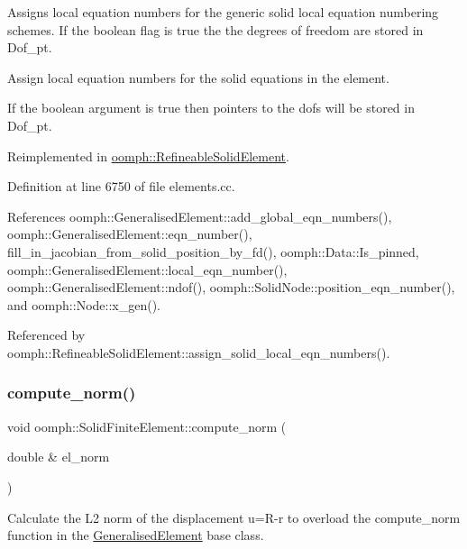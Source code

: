 Assigns local equation numbers for the generic solid local equation numbering schemes. If the boolean flag is true the the degrees of freedom are stored in Dof\+\_\+pt. 

Assign local equation numbers for the solid equations in the element.

If the boolean argument is true then pointers to the dofs will be stored in Dof\+\_\+pt. 

Reimplemented in \hyperlink{classoomph_1_1RefineableSolidElement_a7718105cbc38cff969a246b093b6ecee}{oomph\+::\+Refineable\+Solid\+Element}.



Definition at line 6750 of file elements.\+cc.



References oomph\+::\+Generalised\+Element\+::add\+\_\+global\+\_\+eqn\+\_\+numbers(), oomph\+::\+Generalised\+Element\+::eqn\+\_\+number(), fill\+\_\+in\+\_\+jacobian\+\_\+from\+\_\+solid\+\_\+position\+\_\+by\+\_\+fd(), oomph\+::\+Data\+::\+Is\+\_\+pinned, oomph\+::\+Generalised\+Element\+::local\+\_\+eqn\+\_\+number(), oomph\+::\+Generalised\+Element\+::ndof(), oomph\+::\+Solid\+Node\+::position\+\_\+eqn\+\_\+number(), and oomph\+::\+Node\+::x\+\_\+gen().



Referenced by oomph\+::\+Refineable\+Solid\+Element\+::assign\+\_\+solid\+\_\+local\+\_\+eqn\+\_\+numbers().

\mbox{\label{classoomph_1_1SolidFiniteElement_ace4b1be200ce47b16ec15d429c08a80e}} 
\subsubsection{\texorpdfstring{compute\+\_\+norm()}{compute\_norm()}}
{\footnotesize\ttfamily void oomph\+::\+Solid\+Finite\+Element\+::compute\+\_\+norm (\begin{DoxyParamCaption}\item[{double \&}]{el\+\_\+norm }\end{DoxyParamCaption})\hspace{0.3cm}{\ttfamily [virtual]}}



Calculate the L2 norm of the displacement u=R-\/r to overload the compute\+\_\+norm function in the \hyperlink{classoomph_1_1GeneralisedElement}{Generalised\+Element} base class. 

